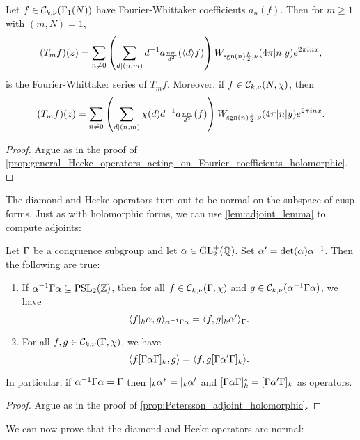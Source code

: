     \begin{proposition}\label{prop:general_Hecke_operators_acting_on_Fourier_coefficients_Maass}
      Let $f \in \mathcal{C}_{k,\nu}(\Gamma_{1}(N))$ have Fourier-Whittaker coefficients $a_{n}(f)$. Then for $m \ge 1$ with $(m,N) = 1$,
      \[
        (T_{m}f)(z) = \sum_{n \neq 0}\left(\sum_{d \mid (n,m)}d^{-1}a_{\frac{nm}{d^{2}}}(\langle d\rangle f)\right)W_{\operatorname{\mathrm{sgn}}(n)\frac{k}{2},\nu}(4\pi|n|y)e^{2\pi inx},
      \]
      is the Fourier-Whittaker series of $T_{m}f$. Moreover, if $f \in \mathcal{C}_{k,\nu}(N,\chi)$, then
      \[
        (T_{m}f)(z) = \sum_{n \neq 0}\left(\sum_{d \mid (n,m)}\chi(d)d^{-1}a_{\frac{nm}{d^{2}}}(f)\right)W_{\operatorname{\mathrm{sgn}}(n)\frac{k}{2},\nu}(4\pi|n|y)e^{2\pi inx}.
      \]
    \end{proposition}
    \begin{proof}
      Argue as in the proof of \cref{prop:general_Hecke_operators_acting_on_Fourier_coefficients_holomorphic}.
    \end{proof}

    The diamond and Hecke operators turn out to be normal on the subspace of cusp forms. Just as with holomorphic forms, we can use \cref{lem:adjoint_lemma} to compute adjoints:

    \begin{proposition}\label{prop:Petersson_adjoint_Maass}
      Let $\Gamma$ be a congruence subgroup and let $\alpha \in \mathrm{GL}_{2}^{+}(\mathbb{Q})$. Set $\alpha' = \det(\alpha)\alpha^{-1}$. Then the following are true:
      \begin{enumerate}[label=(\roman*)]
        \item If $\alpha^{-1}\Gamma\alpha \subseteq \mathrm{PSL}_{2}(\mathbb{Z})$, then for all $f \in \mathcal{C}_{k,\nu}(\Gamma,\chi)$ and $g \in \mathcal{C}_{k,\nu}(\alpha^{-1}\Gamma\alpha)$, we have
        \[
          \langle f|_{k}\alpha,g\rangle_{\alpha^{-1}\Gamma\alpha} = \langle f,g|_{k}\alpha'\rangle_{\Gamma}.
        \]
        \item For all $f,g \in \mathcal{C}_{k,\nu}(\Gamma,\chi)$, we have
        \[
          \langle f[\Gamma\alpha\Gamma]_{k},g\rangle = \langle f,g[\Gamma\alpha'\Gamma]_{k}\rangle.
        \]
      \end{enumerate}
      In particular, if $\alpha^{-1}\Gamma\alpha = \Gamma$ then $|_{k}\alpha^{\ast} = |_{k}\alpha'$ and $[\Gamma\alpha\Gamma]_{k}^{\ast} = [\Gamma\alpha'\Gamma]_{k}$ as operators. 
    \end{proposition}
    \begin{proof}
      Argue as in the proof of \cref{prop:Petersson_adjoint_holomorphic}.
    \end{proof}

    We can now prove that the diamond and Hecke operators are normal:

